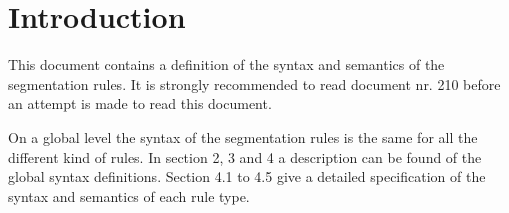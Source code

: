 
\newcommand{\com}[1]{"{\em #1 }"\\}
\newcommand{\tcmone}[1]{\>"{\em #1 }"\\}
\newcommand{\tcmtwo}[1]{\>\>"{\em #1 }"\\}
\newcommand{\tcmthr}[1]{\>\>\>"{\em #1 }"\\}
\newcommand{\tcmfou}[1]{\>\>\>\>"{\em #1 }"\\}
\newcommand{\tcmfiv}[1]{\>\>\>\>\>"{\em #1 }"\\}
\newcommand{\tcmsix}[1]{\>\>\>\>\>\>"{\em #1 }"\\}
\newcommand{\stpw}[2]{"{\bf {(#1)} {\em #2 }}"\\}
\newcommand{\expl}[2]{{\noindent
\bf {(#1)} {\em #2 :}}\\}
\newcommand{\tcdone}[1]{\> #1 \\}
\newcommand{\tcdtwo}[1]{\>\> #1 \\}
\newcommand{\tcdthr}[1]{\>\>\> #1 \\}
\newcommand{\tcdfou}[1]{\>\>\>\> #1 \\}
\newcommand{\tcdfiv}[1]{\>\>\>\>\> #1 \\}
\newcommand{\tcdsix}[1]{\>\>\>\>\>\> #1 \\}
\newcommand{\tcdsev}[1]{\>\>\>\>\>\>\> #1 \\}
\newenvironment{code}{\begin{tabbing}
===\====\====\====\====\====\====\=\kill}{\end{tabbing}}
\RosSupersedes{-}
\MakeRosTitle
\section{Introduction}
This document contains a definition of the syntax and semantics of the
segmentation rules.
It is strongly recommended to read document nr. 210
before an attempt is made to read this document.

On a global level the syntax of the segmentation rules is the same for all
the different kind of rules. In section 2, 3 and 4 a description can be
found of the global syntax definitions. Section 4.1 to 4.5 give a detailed
specification of the syntax and semantics of each rule type.


